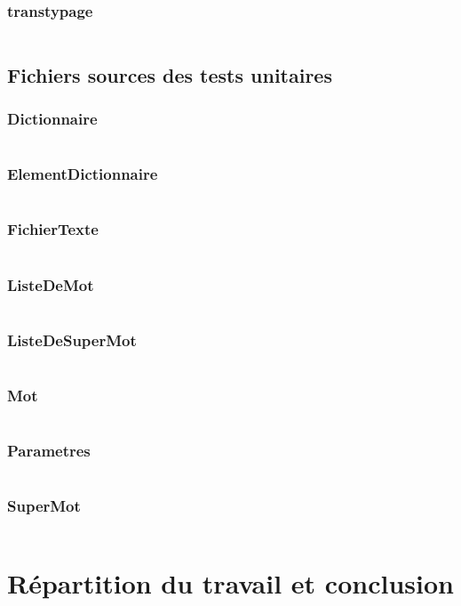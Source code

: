 \documentclass[12pt,titlepage,a4paper]{report}
\newcommand{\inputCodeC}[1]{\inputminted[tabsize=4,linenos]{c}{../programme/src/#1.c}}
\newcommand{\inputTU}[1]{\inputminted[tabsize=4,linenos]{c}{../programme/tests/test#1.c}}
\begin{document}
	\section{transtypage}					\inputCodeC{transtypage}

\chapter{Fichiers sources des tests unitaires}
\minitoc
	\section{Dictionnaire}					\inputTU{TADDictionnaire}
	\section{ElementDictionnaire}			\inputTU{TADElementDictionnaire}
	\section{FichierTexte}					\inputTU{TADFichierTexte}
	\section{ListeDeMot}					\inputTU{TADListeDeMot}
	\section{ListeDeSuperMot}				\inputTU{TADListeDeSuperMot}
	\section{Mot}							\inputTU{TADMot}
	\section{Parametres}					\inputTU{TADParametres}
	\section{SuperMot}						\inputTU{TADSuperMot}


\part{Répartition du travail et conclusion}

\end{document}
